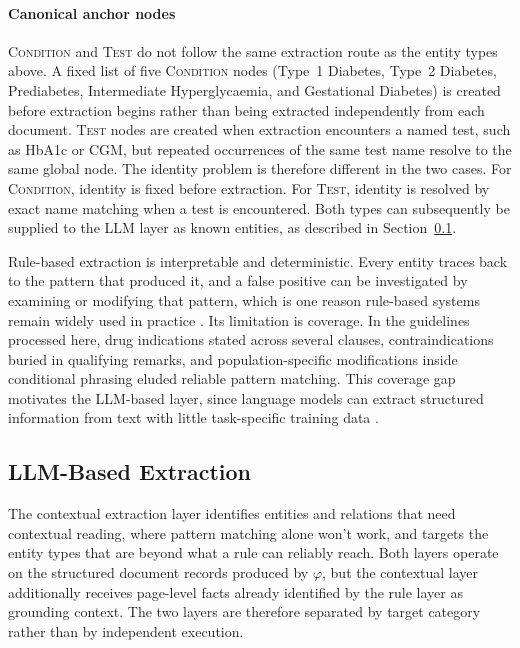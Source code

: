 \paragraph{Canonical anchor nodes}
\textsc{Condition} and \textsc{Test} do not follow the same extraction
route as the entity types above. A fixed list of five \textsc{Condition} nodes
(Type~1 Diabetes, Type~2 Diabetes, Prediabetes, Intermediate
Hyperglycaemia, and Gestational Diabetes) is created before extraction
begins rather than being extracted independently from each document. \textsc{Test} nodes are created when extraction encounters a named test,
such as HbA1c or CGM, but repeated occurrences of the same test name
resolve to the same global node. The identity problem is therefore different in the two cases. For
\textsc{Condition}, identity is fixed before extraction. For
\textsc{Test}, identity is resolved by exact name matching when a test
is encountered. Both types can subsequently be supplied to the LLM layer
as known entities, as described in Section~\ref{sec:llm-extraction}.

Rule-based extraction is interpretable and deterministic. Every entity traces
back to the pattern that produced it, and a false positive can be investigated
by examining or modifying that pattern, which is one reason rule-based systems
remain widely used in practice \cite{chiticariu2013}. Its limitation is
coverage. In the guidelines processed here, drug indications stated across several
clauses, contraindications buried in qualifying remarks, and
population-specific modifications inside conditional phrasing eluded reliable
pattern matching. This coverage gap motivates the LLM-based layer, since
language models can extract structured information from text with little
task-specific training data \cite{xu2024,caufield2024}.

\subsection{LLM-Based Extraction}
\label{sec:llm-extraction}

The contextual extraction layer identifies entities and relations that need contextual reading, where pattern matching alone won't work, and targets the entity types that are beyond what a rule can reliably reach. Both layers operate on the structured document records produced by $\varphi$, but the contextual layer additionally receives page-level facts already identified by the rule layer as grounding context. The two layers are therefore separated by target category rather than by independent execution.

